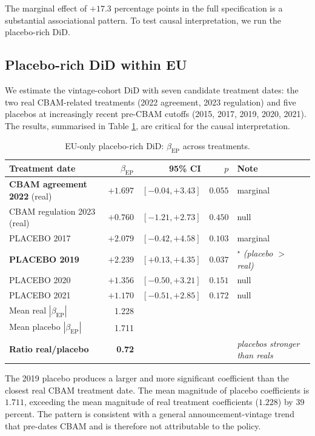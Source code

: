 \documentclass[11pt,a4paper]{article}
\newcommand{\bep}{\beta_{\mathrm{EP}}}
\begin{document}
The marginal effect of $+17.3$ percentage points in the full specification is a substantial associational pattern. To test causal interpretation, we run the placebo-rich DiD.

\subsection{Placebo-rich DiD within EU}

We estimate the vintage-cohort DiD with seven candidate treatment dates: the two real CBAM-related treatments (2022 agreement, 2023 regulation) and five placebos at increasingly recent pre-CBAM cutoffs (2015, 2017, 2019, 2020, 2021). The results, summarised in Table \ref{tab:ch8-eu-placebo}, are critical for the causal interpretation.

\begin{table}[ht]
\centering
\caption{EU-only placebo-rich DiD: $\bep$ across treatments.}
\label{tab:ch8-eu-placebo}
\begin{tabular}{lrrrl}
\toprule
Treatment date & $\bep$ & 95\% CI & $p$ & Note \\
\midrule
\textbf{CBAM agreement 2022} (real) & $+1.697$ & $[-0.04, +3.43]$ & $0.055$ & marginal \\
CBAM regulation 2023 (real)         & $+0.760$ & $[-1.21, +2.73]$ & $0.450$ & null \\
\midrule
PLACEBO 2017 & $+2.079$ & $[-0.42, +4.58]$ & $0.103$ & marginal \\
\textbf{PLACEBO 2019} & $\mathbf{+2.239}$ & $\mathbf{[+0.13, +4.35]}$ & $\mathbf{0.037}$ & $^{\star}$ \emph{(placebo $>$ real)} \\
PLACEBO 2020 & $+1.356$ & $[-0.50, +3.21]$ & $0.151$ & null \\
PLACEBO 2021 & $+1.170$ & $[-0.51, +2.85]$ & $0.172$ & null \\
\midrule
Mean real $|\bep|$    & 1.228 & & & \\
Mean placebo $|\bep|$ & 1.711 & & & \\
\rowcolor{red!10}
\textbf{Ratio real/placebo} & \textbf{0.72} & & & \emph{placebos stronger than reals} \\
\bottomrule
\end{tabular}
\end{table}

The 2019 placebo produces a larger and more significant coefficient than the closest real CBAM treatment date. The mean magnitude of placebo coefficients is $1.711$, exceeding the mean magnitude of real treatment coefficients ($1.228$) by 39 percent. The pattern is consistent with a general announcement-vintage trend that pre-dates CBAM and is therefore not attributable to the policy.
\end{document}
